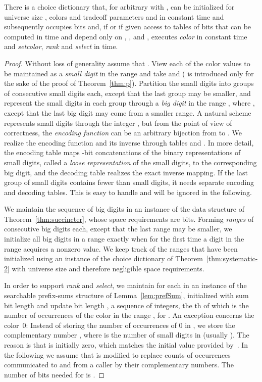 \documentclass[envcountsame,envcountsect,undated,nolinenumbers]{lnthi}
\def\Tvn#1{\hbox{\textit{#1\/}}}
\begin{document}
\begin{lemma}
\label{lem:p-t}There is a choice dictionary that, for arbitrary
 with ,
can be initialized for universe
size ,  colors and tradeoff parameters  and 
in constant time
and subsequently occupies
 bits and,
if  or if given access to tables of  bits
that can be computed in  time
and depend only on , ,  and , executes
\Tvn{color} in constant time and \Tvn{setcolor}, 
\Tvn{rank} and \Tvn{select}
in  time.
\end{lemma}

\begin{proof}
Without loss of generality assume that .
View each of the  color values to be maintained
as a \emph{small digit} in the range 
and take  and
 ( is introduced only for
the sake of the proof of
Theorem~\ref{thm:p}).
Partition the  small digits into
 groups of 
consecutive small digits each, except that the
last group may be smaller, and represent the
small digits in each group through a \emph{big digit}
in the range ,
where , except that the last big digit
may come from a smaller range.
A natural scheme represents small digits
 through the integer
, but from the
point of view of correctness, the
\emph{encoding function} can be an arbitrary
bijection from  to
.
We realize the encoding function and its
inverse through tables  and .
In more detail, the encoding table  maps
-bit concatenations of
the binary representations of  small digits,
called a \emph{loose representation}
of the  small digits,
to the corresponding big digit, and the
decoding table  realizes the
exact inverse mapping.
If the last group of small digits contains fewer
than  small digits, it needs separate
encoding and decoding tables.
This is easy to handle and will be
ignored in the following.

We maintain the sequence of  big
digits in an instance  of the data structure of
Theorem~\ref{thm:succincter},
whose space requirements are
 bits.
Forming 
\emph{ranges} 
of  consecutive big digits each,
except that the last range may be smaller,
we initialize all big digits in a range
exactly when for the first time a
digit in the range acquires a nonzero value.
We keep track of the ranges that have been initialized
using an instance of the choice dictionary
of Theorem~\ref{thm:systematic-2} with
universe size  and therefore
negligible space requirements.

In order to support \Tvn{rank} and \Tvn{select},
we maintain for each 
in an instance   of the searchable prefix-sums structure
of Lemma~\ref{lem:prefSum}, initialized with
sum bit length
 and update bit length , a sequence
of  integers, the th of which is the
number of occurrences of the color  in the range ,
for .
An exception concerns the color~0:
Instead of storing the number  of
occurrences of 0 in ,
we store the complementary number ,
where  is the number of small digits
in  (usually ).
The reason is that  is initially zero,
which matches the initial value provided by~.
In the following we assume that  is
modified to replace counts of occurrences
communicated to and from a caller by their
complementary numbers.
The number of bits needed for 
is .


\end{proof}
\end{document}
